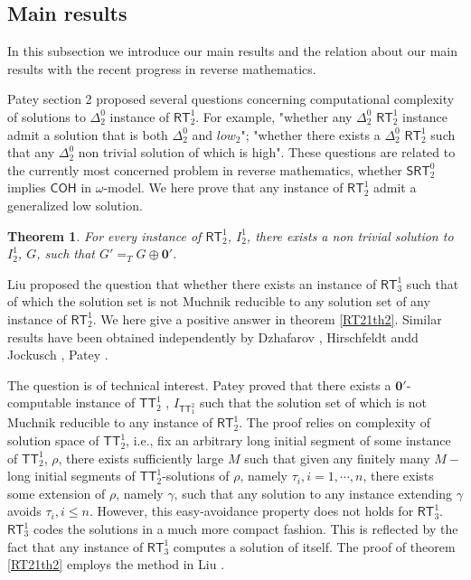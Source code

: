 \documentclass[options]{amsart}
\newtheorem{theorem}{Theorem}[section]
\theoremstyle{definition}
\theoremstyle{remark}
\newtheorem{Ramsey's theorem}[theorem]{Ramsey's theorem}
\begin{document}
\subsection{Main results}
\label{RT21subsecmain}

In this subsection we introduce
 our main results and
 the relation
about our main results with the recent
progress in reverse mathematics.

Patey \cite{patey2015open} section 2
proposed several questions concerning
computational complexity of
solutions to $\Delta_2^0$ instance of
$\mathsf{RT}_2^1$.
For example, "whether any $\Delta_2^0$
$\mathsf{RT}_2^1$ instance
admit a solution that is both $\Delta_2^0$
and $low_2$";
"whether there exists a $\Delta_2^0$
$\mathsf{RT}_2^1$ such that any $\Delta_2^0$ non trivial
solution of which is high".
These questions are  related to the
currently most concerned problem in reverse mathematics,
whether $\mathsf{SRT}_2^0$ implies
$\mathsf{COH}$ in $\omega$-model.
We here prove that any instance of $\mathsf{RT}_2^1$
admit a generalized low solution.

\begin{theorem}\label{RT21th1}
For every instance of $\mathsf{RT}_2^1$,
$I_2^1$, there exists a non trivial
solution to $I_2^1$, $G$, such that
$G' =_T G\oplus \mathbf{0}'$.

\end{theorem}

Liu \cite{liu2015cone} proposed the
question that whether there exists
an instance of $\mathsf{RT}_3^1$ such that
of which the
 solution set is not Muchnik reducible
to any solution set of any instance of
$\mathsf{RT}_2^1$. We here give a positive
answer in theorem \ref{RT21th2}.
Similar results have been obtained independently
by 
Dzhafarov
\cite{dzhafarov2015cohesive},
Hirschfeldt andd Jockusch
\cite{hirschfeldt2015notions},
Patey \cite{patey2015weakness}.

The question is of technical interest.
Patey \cite{patey2015strength} proved that there exists
a $\mathbf{0}'$-computable instance of
$\mathsf{TT}_2^1$
, $I_{\mathsf{TT}^2_1}$ such that the solution
set of which is not Muchnik reducible
to any instance of $\mathsf{RT}_2^1$.
The proof relies on complexity of solution
space of $\mathsf{TT}_2^1$, i.e., fix an
arbitrary long initial segment of some
instance of $\mathsf{TT}_2^1$, $\rho$,
there exists sufficiently large $M$ such that
  given
any finitely many $M-$long initial segments
of  $\mathsf{TT}_2^1$-solutions
of $\rho$, namely
$\tau_i,i=1,\cdots,n$,
there exists some extension of $\rho$,
namely $\gamma$, such that any solution
to any instance extending $\gamma$ avoids
$\tau_i, i\leq n$.
However, this easy-avoidance property
does not holds for $\mathsf{RT}_3^1$.
$\mathsf{RT}_3^1$ codes the solutions
in a much more compact fashion. This is
reflected by the fact that any instance of
$\mathsf{RT}_3^1$ computes a solution of
itself.
The proof of theorem \ref{RT21th2}
employs the method in
Liu \cite{liu2015cone}.
\end{document}
